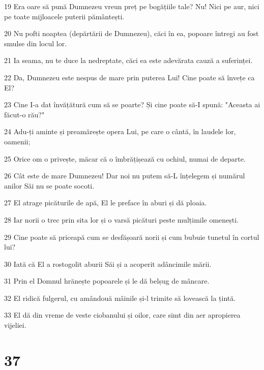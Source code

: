 \par 19 Era oare să pună Dumnezeu vreun preț pe bogățiile tale? Nu! Nici pe aur, nici pe toate mijloacele puterii pământești.
\par 20 Nu pofti noaptea (depărtării de Dumnezeu), căci în ea, popoare întregi au fost smulse din locul lor.
\par 21 Ia seama, nu te duce la nedreptate, căci ea este adevărata cauză a suferinței.
\par 22 Da, Dumnezeu este nespus de mare prin puterea Lui! Cine poate să învețe ca El?
\par 23 Cine I-a dat învățătură cum să se poarte? Și cine poate să-I spună: "Aceasta ai făcut-o rău?"
\par 24 Adu-ți aminte și preamărește opera Lui, pe care o cântă, în laudele lor, oamenii;
\par 25 Orice om o privește, măcar că o îmbrățișează cu ochiul, numai de departe.
\par 26 Cât este de mare Dumnezeu! Dar noi nu putem să-L înțelegem și numărul anilor Săi nu se poate socoti.
\par 27 El atrage picăturile de apă, El le preface în aburi și dă ploaia.
\par 28 Iar norii o trec prin sita lor și o varsă picături peste mulțimile omenești.
\par 29 Cine poate să priceapă cum se desfășoară norii și cum bubuie tunetul în cortul lui?
\par 30 Iată că El a rostogolit aburii Săi și a acoperit adâncimile mării.
\par 31 Prin el Domnul hrănește popoarele și le dă belșug de mâncare.
\par 32 El ridică fulgerul, cu amândouă mâinile și-l trimite să lovească la țintă.
\par 33 El dă din vreme de veste ciobanului și oilor, care simt din aer apropierea vijeliei.

\chapter{37}

